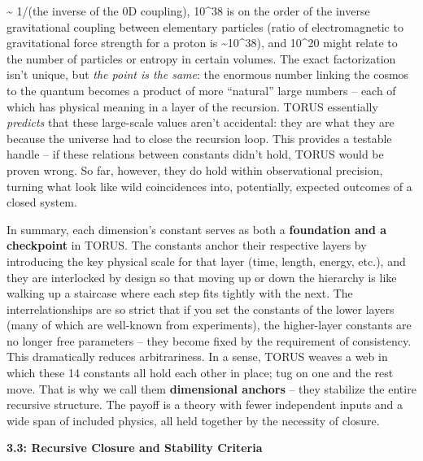 \documentclass[
]{article}
\begin{document}
\begin{itemize}
  \textasciitilde{} 1/\alpha (the inverse of the 0D coupling), 10\^{}38 is on
  the order of the inverse gravitational coupling between elementary
  particles (ratio of electromagnetic to gravitational force strength
  for a proton is \textasciitilde10\^{}38), and 10\^{}20 might relate to
  the number of particles or entropy in certain volumes\hspace{0pt}. The
  exact factorization isn't unique, but \emph{the point is the same}:
  the enormous number linking the cosmos to the quantum becomes a
  product of more ``natural'' large numbers -- each of which has
  physical meaning in a layer of the recursion\hspace{0pt}. TORUS
  essentially \emph{predicts} that these large-scale values aren't
  accidental: they are what they are because the universe had to close
  the recursion loop. This provides a testable handle -- if these
  relations between constants didn't hold, TORUS would be proven
  wrong\hspace{0pt}. So far, however, they do hold within observational
  precision, turning what look like wild coincidences into, potentially,
  expected outcomes of a closed system.
\end{itemize}

In summary, each dimension's constant serves as both a
\textbf{foundation and a checkpoint} in TORUS. The constants anchor
their respective layers by introducing the key physical scale for that
layer (time, length, energy, etc.), and they are interlocked by design
so that moving up or down the hierarchy is like walking up a staircase
where each step fits tightly with the next. The interrelationships are
so strict that if you set the constants of the lower layers (many of
which are well-known from experiments), the higher-layer constants are
no longer free parameters -- they become fixed by the requirement of
consistency\hspace{0pt}. This dramatically reduces arbitrariness. In a
sense, TORUS weaves a web in which these 14 constants all hold each
other in place; tug on one and the rest move. That is why we call them
\textbf{dimensional anchors} -- they stabilize the entire recursive
structure. The payoff is a theory with fewer independent inputs and a
wide span of included physics, all held together by the necessity of
closure.

\textbf{3.3: Recursive Closure and Stability Criteria}
\end{document}

